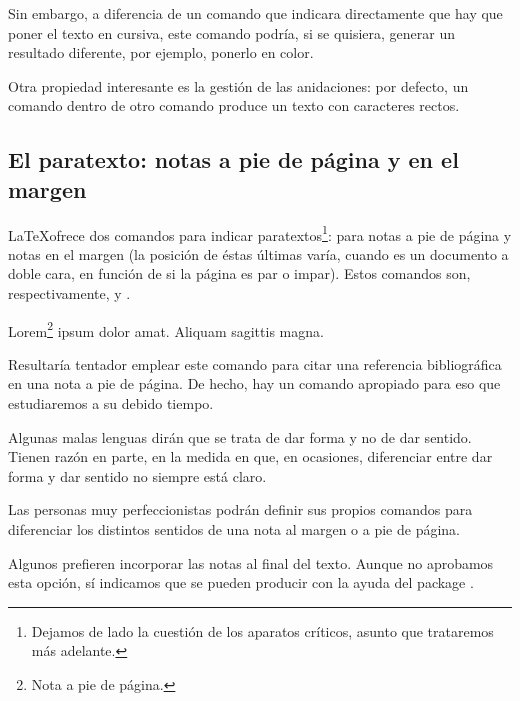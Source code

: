 Sin embargo, a diferencia de un comando que indicara directamente que hay que poner el texto en cursiva, este comando podría, si se quisiera, generar un resultado diferente, por ejemplo, ponerlo en color. 

Otra propiedad interesante es la gestión de las anidaciones: por defecto, un comando  dentro de otro comando  produce un texto con caracteres rectos.

\subsection{El paratexto: notas a pie de página y en el margen}

\LaTeX ofrece dos comandos para indicar paratextos\footnote{Dejamos de lado la cuestión de los aparatos críticos, asunto que trataremos más adelante.}: para notas a pie de página y notas en el margen (la posición de éstas últimas varía, cuando es un documento a doble cara, en función de si la página es par o impar). Estos comandos son, respectivamente,  y .

\begin{latexcode}
Lorem\footnote{Nota a pie de página.} ipsum dolor amat.
Aliquam sagittis magna.
\end{latexcode}

\begin{attention}
    Resultaría tentador emplear este comando para citar una referencia bibliográfica en una nota a pie de página. De hecho, hay un comando apropiado para eso que estudiaremos a su debido tiempo.
\end{attention}
\begin{attention}
  Algunas malas lenguas dirán que se trata de dar forma y no de dar sentido. Tienen razón en parte, en la medida en que, en ocasiones, diferenciar entre dar forma y dar sentido no siempre está claro.
    
  Las personas muy perfeccionistas podrán definir sus propios comandos para diferenciar los distintos sentidos de una nota al margen o a pie de página.
\end{attention}

\begin{plusloins}
 Algunos prefieren incorporar las notas al final del texto.  Aunque no aprobamos esta opción, sí indicamos que se pueden producir con la ayuda del package .
\end{plusloins}

